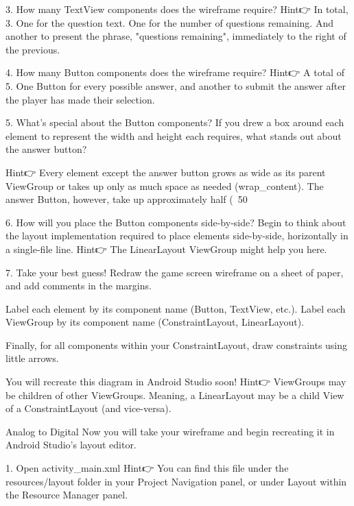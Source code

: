     3. How many TextView components does the wireframe require?
        Hint👉 In total, 3. One for the question text. One for the number of questions remaining. And another to present the phrase, "questions remaining", immediately to the right of the previous.

    4. How many Button components does the wireframe require?
        Hint👉 A total of 5. One Button for every possible answer, and another to submit the answer after the player has made their selection.

    5. What’s special about the Button components?
        If you drew a box around each element to represent the width and height each requires, what stands out about the answer button?

        Hint👉 Every element except the answer button grows as wide as its parent ViewGroup or takes up only as much space as needed (wrap_content).
        The answer Button, however, take up approximately half (~50%

    6. How will you place the Button components side-by-side?
        Begin to think about the layout implementation required to place elements side-by-side, horizontally in a single-file line.
        Hint👉 The LinearLayout ViewGroup might help you here.

    7. Take your best guess!
        Redraw the game screen wireframe on a sheet of paper, and add comments in the margins.

        Label each element by its component name (Button, TextView, etc.). Label each ViewGroup by its component name (ConstraintLayout, LinearLayout).

        Finally, for all components within your ConstraintLayout, draw constraints using little arrows.

        You will recreate this diagram in Android Studio soon!
        Hint👉 ViewGroups may be children of other ViewGroups. Meaning, a LinearLayout may be a child View of a ConstraintLayout (and vice-versa).

    Analog to Digital
        Now you will take your wireframe and begin recreating it in Android Studio’s layout editor.

    1. Open activity_main.xml
        Hint👉 You can find this file under the resources/layout folder in your Project Navigation panel, or under Layout within the Resource Manager panel.

